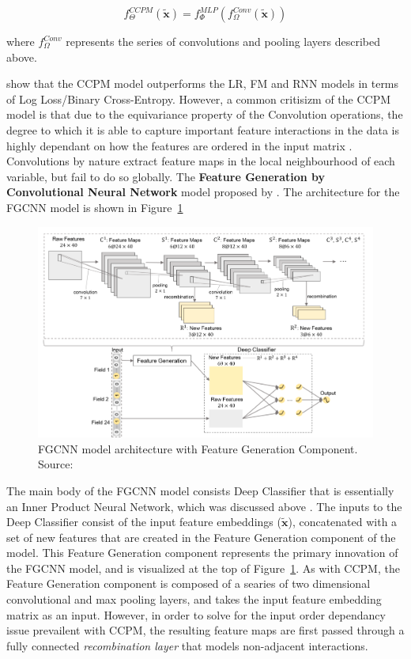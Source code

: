 \documentclass{mldsmsc}
\begin{document}
\begin{equation}\label{eqn:ccpm}
    f_{\Theta}^{CCPM}(\tilde{\mathbf{x}}) = f_{\Phi}^{MLP}(f_{\Omega}^{Conv}(\tilde{\mathbf{x}}))
\end{equation}

where $f_{\Omega}^{Conv}$ represents the series of convolutions and pooling layers described above.

\cite{RefWorks:liu2015convolutional} show that the CCPM model outperforms the LR, FM and RNN models
in terms of Log Loss/Binary Cross-Entropy. However, a common critisizm of the CCPM model is that
due to the equivariance property of the Convolution operations, the degree to which it is able to capture
important feature interactions in the data is highly dependant on how the features are ordered in the
input matrix \citep{RefWorks:zhang2021deep,RefWorks:qu2018product-based,RefWorks:gu2021ad}. Convolutions
by nature extract feature maps in the local neighbourhood of each variable, but fail to do so globally.
The \textbf{Feature Generation by Convolutional Neural Network} model proposed by \cite{RefWorks:liu2019feature}.
The architecture for the FGCNN model is shown in Figure~\ref{fig:fgcnn}

\begin{figure}[h]
    \centering
    \includegraphics[width=\textwidth]{../figures/fgcnn.png}
    \caption{FGCNN model architecture with Feature Generation Component. Source: \citep{RefWorks:liu2019feature}}
    \label{fig:fgcnn}
\end{figure}

The main body of the FGCNN model consists Deep Classifier that is essentially an Inner Product
Neural Network, which was discussed above \citep{RefWorks:qu2018product-based}. The inputs
to the Deep Classifier consist of the input feature embeddings ($\tilde{\mathbf{x}}$), concatenated
with a set of new features that are created in the Feature Generation component of the model. This
Feature Generation component represents the primary innovation of the FGCNN model, and is visualized
at the top of Figure~\ref{fig:fgcnn}. As with CCPM, the Feature Generation component is composed of
a searies of two dimensional convolutional and max pooling layers, and takes the input feature
embedding matrix as an input. However, in order to solve for the input order dependancy issue
prevailent with CCPM, the resulting feature maps are first passed through a fully connected \emph{recombination layer}
that models non-adjacent interactions.
\end{document}
